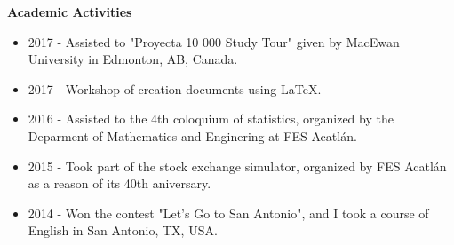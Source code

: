\documentclass[11pt,letter]{article}
\begin{document}
\textbf{Academic Activities}
\begin{itemize}
\item 2017 - Assisted to "Proyecta 10 000 Study Tour" given by MacEwan University in Edmonton, AB, Canada.
\item 2017 - Workshop of creation documents using \LaTeX.
\item 2016 - Assisted to the 4th coloquium of statistics, organized by the Deparment of Mathematics and Enginering at FES Acatlán.
\item 2015 - Took part of the stock exchange simulator, organized by FES Acatlán as a reason of its 40th aniversary.
\item 2014 - Won the contest "Let's Go to San Antonio", and I took a course of English in San Antonio, TX, USA. 
\end{itemize}
\end{document}
